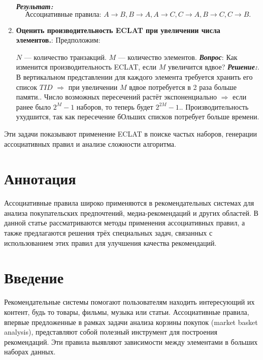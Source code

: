 \begin{enumerate}
{    \textbf{\textit{Результат:}}\newline
    \[
    \text{Ассоциативные правила: } A \rightarrow B, B \rightarrow A, A \rightarrow C, C \rightarrow A, B \rightarrow C, C \rightarrow B.
    \]}
    \item {\textbf{Оценить производительность ECLAT при увеличении числа элементов.}:\newline
    Предположим:\par
    \(N\) — количество транзакций.\newline
    \(M\) — количество элементов.\newline
    \textbf{\textit{Вопрос}}: Как изменится производительность ECLAT, если \(M\) увеличится вдвое?\newline
    \textbf{\textit{Решение:}}. В вертикальном представлении для каждого элемента требуется хранить его список \(TID\) $\Rightarrow$ при увеличении \(M\) вдвое потребуется в 2 раза больше памяти.. Число возможных пересечений растёт экспоненциально $\Rightarrow$ если ранее было \(2^M - 1\) наборов, то теперь будет \(2^{2M} - 1\).. Производительность ухудшится, так как пересечение бОльших списков потребует больше времени.\newline}
\end{enumerate}
Эти задачи показывают применение ECLAT в поиске частых наборов, генерации ассоциативных правил и анализе сложности алгоритма.

\section*{Аннотация}
Ассоциативные правила широко применяются в рекомендательных системах для анализа покупательских предпочтений, медиа-рекомендаций и других областей. В данной статье рассматриваются методы применения ассоциативных правил, а также предлагаются решения трёх специальных задач, связанных с использованием этих правил для улучшения качества рекомендаций.

\tableofcontents

\newpage

\section{Введение}
Рекомендательные системы помогают пользователям находить интересующий их контент, будь то товары, фильмы, музыка или статьи. Ассоциативные правила, впервые предложенные в рамках задачи анализа корзины покупок (market basket analysis), представляют собой полезный инструмент для построения рекомендаций. Эти правила выявляют зависимости между элементами в больших наборах данных.

